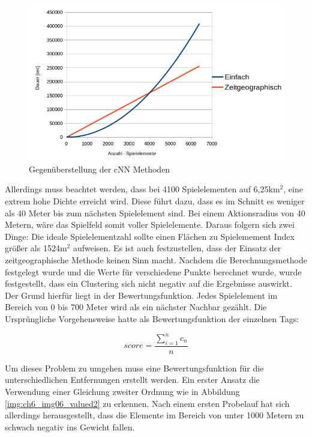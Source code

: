 \begin{figure}[H]
\begin{center}
\includegraphics[width=150mm]{images/ch6_img05_eval_match.png}
\caption{Gegenüberstellung der cNN Methoden}
\label{img:ch6_img05_eval_match}
\end{center}
\end{figure}

Allerdings muss beachtet werden, dass bei 4100 Spielelementen auf 6,25km$^2$, eine extrem hohe Dichte erreicht wird. Diese führt dazu, dass es im Schnitt es weniger als 40 Meter bis zum nächsten Spielelement sind. Bei einem Aktionsradius von 40 Metern, wäre das Spielfeld somit voller Spielelemente. Daraus folgern sich zwei Dinge:
Die ideale Spielelementzahl sollte einen Flächen zu Spielemement Index größer als 1524m$^2$ aufweisen.
Es ist auch festzustellen, dass der Einsatz der zeitgeographische Methode keinen Sinn macht.
Nachdem die Berechnungsmethode festgelegt wurde und die Werte für verschiedene Punkte berechnet wurde, wurde festgestellt, dass ein Clustering sich nicht negativ auf die Ergebnisse auswirkt.
Der Grund hierfür liegt in der Bewertungsfunktion. Jedes Spielelement im Bereich von 0 bis 700 Meter wird als ein nächster Nachbar gezählt.
Die Ursprüngliche Vorgehensweise hatte als Bewertungsfunktion der einzelnen Tags:

\begin{equation}
score = \frac{ \sum\limits_{i=1}^n c_n }{n}
\end{equation}

Um dieses Problem zu umgehen muss eine Bewertungsfunktion für die unterschiedlichen Entfernungen erstellt werden. Ein erster Ansatz die Verwendung einer Gleichung zweiter Ordnung wie in Abbildung \ref{img:ch6_img06_valued2} zu erkennen. Nach einem ersten Probelauf hat sich allerdings herausgestellt, dass die Elemente im Bereich von unter 1000 Metern zu schwach negativ ins Gewicht fallen.

